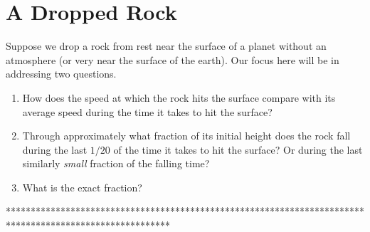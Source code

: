 \documentclass{ximera}
\begin{document}
\section{A Dropped Rock}
Suppose we drop a rock from rest near the surface of a planet without an atmosphere (or very near the surface of the earth). Our focus here will be in addressing two questions.

\begin{question} \label{Q54rghgeyghhg}

\begin{enumerate}
\item How does the speed at which the rock hits the surface compare with its average speed during the time it takes to hit the surface?

\item Through approximately what fraction of its initial height does the rock fall during the last $1/20$ of the time it takes to hit the surface? Or during the  last similarly \emph{small} fraction of the falling time? 
\item What is the exact fraction? 
\end{enumerate}
\end{question}



\iffalse

*********************************************************************************************************
\end{document}
